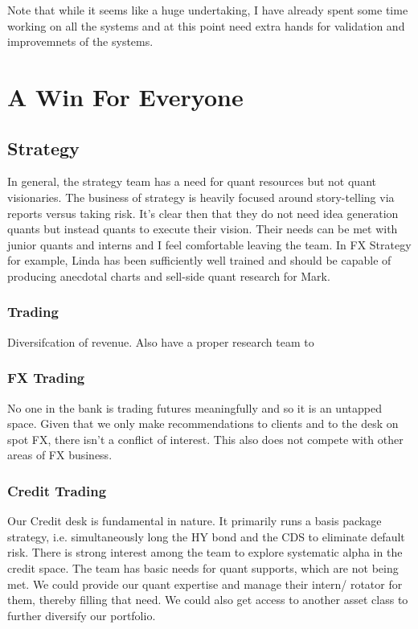 \documentclass{article}
\begin{document}
Note that while it seems like a huge undertaking, I have already spent some time working on all the systems and at this point need extra hands for validation and improvemnets of the systems. 


\section{A Win For Everyone}

\subsection{Strategy}
In general, the strategy team has a need for quant resources but not quant visionaries. The business of strategy is heavily focused around story-telling via reports versus taking risk. It's clear then that they do not need idea generation quants but instead quants to execute their vision. Their needs can be met with junior quants and interns and I feel comfortable leaving the team. In FX Strategy for example, Linda has been sufficiently well trained and should be capable of producing anecdotal charts and sell-side quant research for Mark.

\subsubsection{Trading}
Diversifcation of revenue. Also have a proper research team to 

\subsubsection{FX Trading}
No one in the bank is trading futures meaningfully and so it is an untapped space. Given that we only make recommendations to clients and to the desk on spot FX, there isn't a conflict of interest. This also does not compete with other areas of FX business. 

\subsubsection{Credit Trading}
Our Credit desk is fundamental in nature. It primarily runs a basis package strategy, i.e. simultaneously long the HY bond and the CDS to eliminate default risk. There is strong interest among the team to explore systematic alpha in the credit space. The team has basic needs for quant supports, which are not being met. We could provide our quant expertise and manage their intern/ rotator for them, thereby filling that need. We could also get access to another asset class to further diversify our portfolio.
\end{document}
